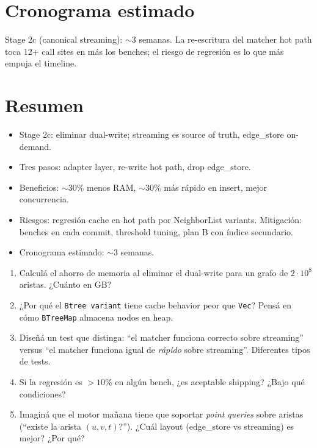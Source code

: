 \section{Cronograma estimado}

Stage 2c (canonical streaming): $\sim$3 semanas. La re-escritura
del matcher hot path toca 12+ call sites en
 más los benches; el
riesgo de regresión es lo que más empuja el timeline.

\section{Resumen}

\begin{itemize}
    \item Stage 2c: eliminar dual-write; streaming es source of
    truth, edge\_store on-demand.
    \item Tres pasos: adapter layer, re-write hot path, drop
    edge\_store.
    \item Beneficios: \(\sim 30\%\) menos RAM, \(\sim 30\%\) más
    rápido en insert, mejor concurrencia.
    \item Riesgos: regresión cache en hot path por NeighborList
    variants. Mitigación: benches en cada commit, threshold
    tuning, plan B con índice secundario.
    \item Cronograma estimado: $\sim$3 semanas.
\end{itemize}

\begin{ejercicios}
\begin{enumerate}
    \item \starred{} Calculá el ahorro de memoria al eliminar el
    dual-write para un grafo de \(2 \cdot 10^8\) aristas. ¿Cuánto
    en GB?

    \item ¿Por qué el \texttt{Btree variant} tiene cache behavior
    peor que \texttt{Vec}? Pensá en cómo \texttt{BTreeMap}
    almacena nodos en heap.

    \item \starred{} Diseñá un test que distinga: ``el matcher
    funciona correcto sobre streaming'' versus ``el matcher
    funciona igual de \emph{rápido} sobre streaming''. Diferentes
    tipos de tests.

    \item Si la regresión es \(> 10\%\) en algún bench, ¿es
    aceptable shipping? ¿Bajo qué condiciones?

    \item Imaginá que el motor mañana tiene que soportar
    \emph{point queries} sobre aristas (``existe la arista
    \((u, v, t)\)?''). ¿Cuál layout (edge\_store vs streaming) es
    mejor? ¿Por qué?
\end{enumerate}
\end{ejercicios}
